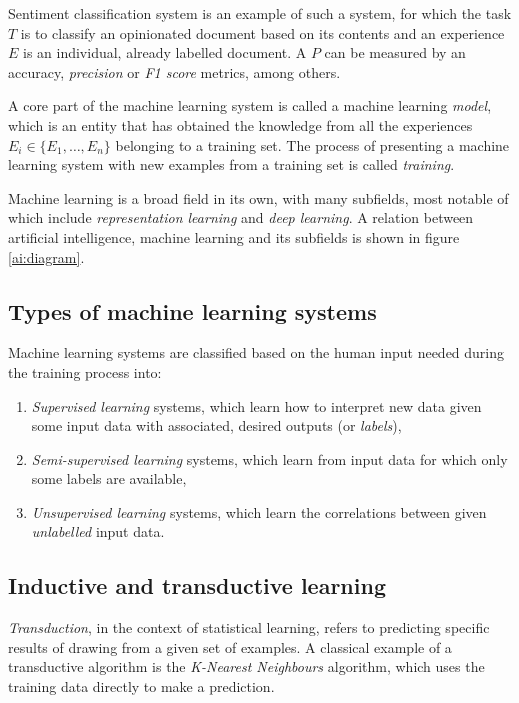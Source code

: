 Sentiment classification system is an example of such a system, for which the task $T$ is to classify an opinionated document based on its contents and an experience $E$ is an individual, already labelled document. A $P$ can be measured by an accuracy, \emph{precision} or \emph{F1 score} metrics, among others. 


A core part of the machine learning system is called a machine learning \emph{model}, which is an entity that has obtained the knowledge from all the experiences $E_i \in \{E_1, \dots, E_n\}$ belonging to a training set. The process of presenting a machine learning system with new examples from a training set is called \emph{training}.

Machine learning is a broad field in its own, with many subfields, most notable of which include \emph{representation learning} and \emph{deep learning}. A relation between artificial intelligence, machine learning and its subfields is shown in figure \ref{ai:diagram}.

\subsection{Types of machine learning systems}

Machine learning systems are classified based on the human input needed during the training process into:

\begin{enumerate}
\item \emph{Supervised learning} systems, which learn how to interpret new data given some input data with associated, desired outputs (or \emph{labels}),
\item \emph{Semi-supervised learning} systems, which learn from input data for which only some labels are available,
\item \emph{Unsupervised learning} systems, which learn the correlations between given \textit{unlabelled} input data.
\end{enumerate}


\subsection{Inductive and transductive learning}

\emph{Transduction}, in the context of statistical learning, refers to predicting specific results of drawing from a given set of examples. A classical example of a transductive algorithm is the \emph{K-Nearest Neighbours} algorithm, which uses the training data directly to make a prediction.

